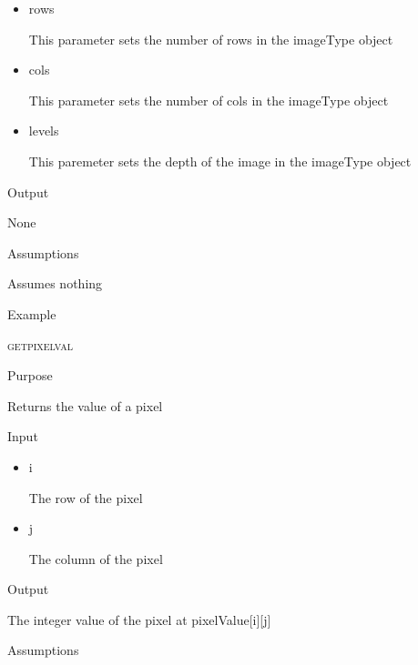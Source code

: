 \documentclass[pdftex, 11pt]{article}
\begin{document}
\begin{description}
\begin{description}
				\begin{itemize}
					\item{rows}

						This parameter sets the number of rows
						in the imageType object

					\item{cols}

						This parameter sets the number of cols
						in the imageType object

					\item{levels}

						This paremeter sets the depth of the
						image in the imageType object

				\end{itemize}

			\item{Output}

				None

			\item{Assumptions}

				Assumes nothing

			\item{Example}

		\end{description}




	\item{\textsc{getpixelval}}
		\begin{description}
			\item{Purpose}

				Returns the value of a pixel

			\item{Input}

				\begin{itemize}

					\item{i}
					
						The row of the pixel

					\item{j} 

						The column of the pixel

				\end{itemize}

			\item{Output}

				The integer value of the pixel at 
				pixelValue[i][j]


			\item{Assumptions}


\end{description}
\end{description}
\end{document}
